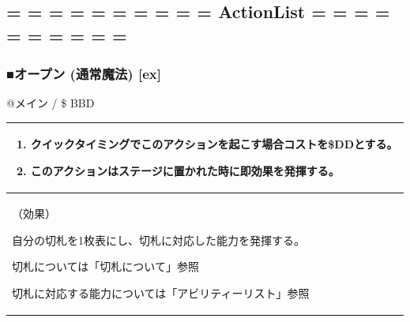 \documentclass[twocolumn,a5paper,papersize,10pt]{jarticle}
\begin{document}
\begin{center}
\begin{center}
\section*{= = = = = = = = = = ActionList = = = = = = = = = =}
\end{center}
\end{center}
\vspace{-2zh}%

\vspace{1zh} %
\subsubsection*{■オープン (通常魔法) [ex]} %
\vspace{-0.5zh}

@メイン
  / \$ BBD

\vspace{-1.2zh}%
\begin{spacing}{0.8}%
\begin{center}

\begin{tabularx}{6.5cm}{p{6cm}} \toprule[0.4pt]
\vspace{-1zh}%

\vspace{-1zh}%
\begin{enumerate}
\renewcommand{\labelenumi}{※}
\setlength{\leftskip}{-0.3cm}
\setlength{\itemsep}{0pt} %
\setlength{\parskip}{0pt} %

\item クイックタイミングでこのアクションを起こす場合コストを\$DDとする。

\item このアクションはステージに置かれた時に即効果を発揮する。
\vspace{-2.5zh}%
\end{enumerate}
\vspace{-1zh}%
\\ \midrule[0.4pt]
（効果）

自分の切札を1枚表にし、切札に対応した能力を発揮する。 

切札については「切札について」参照

切札に対応する能力については「アビリティーリスト」参照
\\ \bottomrule[0.4pt]
\end{tabularx}

\end{center}
\end{spacing}
\vspace{-4zh}
\end{document}
